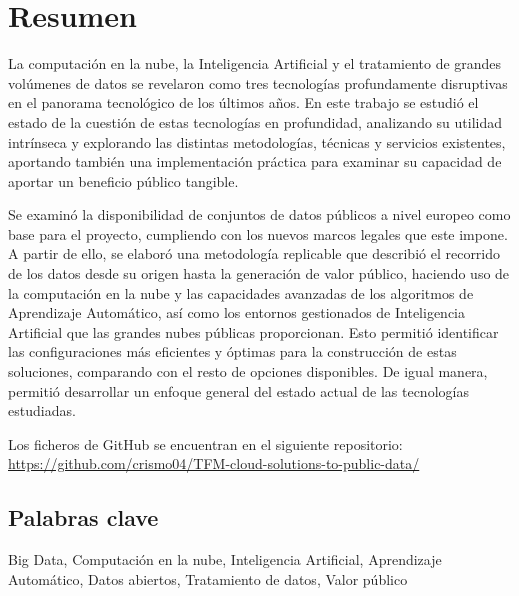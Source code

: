 \chapter*{Resumen}

La computación en la nube, la Inteligencia Artificial y el tratamiento de grandes volúmenes de datos se revelaron como tres tecnologías profundamente disruptivas en el panorama tecnológico de los últimos años. En este trabajo se estudió el estado de la cuestión de estas tecnologías en profundidad, analizando su utilidad intrínseca y explorando las distintas metodologías, técnicas y servicios existentes, aportando también una implementación práctica para examinar su capacidad de aportar un beneficio público tangible.

Se examinó la disponibilidad de conjuntos de datos públicos a nivel europeo como base para el proyecto, cumpliendo con los nuevos marcos legales que este impone. A partir de ello, se elaboró una metodología replicable que describió el recorrido de los datos desde su origen hasta la generación de valor público, haciendo uso de la computación en la nube y las capacidades avanzadas de los algoritmos de Aprendizaje Automático, así como los entornos gestionados de Inteligencia Artificial que las grandes nubes públicas proporcionan. Esto permitió identificar las configuraciones más eficientes y óptimas para la construcción de estas soluciones, comparando con el resto de opciones disponibles. De igual manera, permitió desarrollar un enfoque general del estado actual de las tecnologías estudiadas.

Los ficheros de GitHub se encuentran en el siguiente repositorio:  \url{https://github.com/crismo04/TFM-cloud-solutions-to-public-data/}
	
\section*{Palabras clave}
   
\noindent Big Data, Computación en la nube, Inteligencia Artificial, Aprendizaje Automático, Datos abiertos, Tratamiento de datos, Valor público
   


